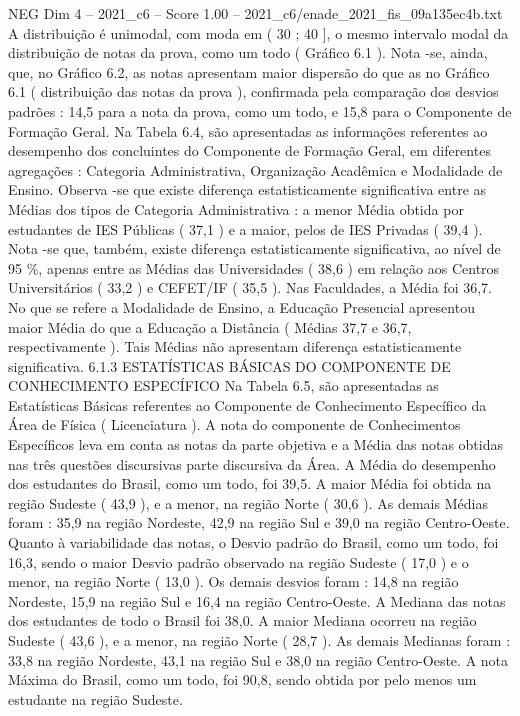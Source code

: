 \begin{textsample}{NEG Dim 4 – 2021\_c6 – Score 1.00 – 2021\_c6/enade\_2021\_fis\_09a135ec4b.txt}
A distribuição é unimodal, com moda em ( 30 ; 40 ], o mesmo intervalo modal da distribuição de notas da prova, como um todo ( Gráfico 6.1 ).
Nota -se, ainda, que, no Gráfico 6.2, as notas apresentam maior dispersão do que as no Gráfico 6.1 ( distribuição das notas da prova ), confirmada pela comparação dos desvios padrões : 14,5 para a nota da prova, como um todo, e 15,8 para o Componente de Formação Geral.
Na Tabela 6.4, são apresentadas as informações referentes ao desempenho dos concluintes do Componente de Formação Geral, em diferentes agregações : Categoria Administrativa, Organização Acadêmica e Modalidade de Ensino.
Observa -se que existe diferença estatisticamente significativa entre as Médias dos tipos de Categoria Administrativa : a menor Média obtida por estudantes de IES Públicas ( 37,1 ) e a maior, pelos de IES Privadas ( 39,4 ).
Nota -se que, também, existe diferença estatisticamente significativa, ao nível de 95 \%, apenas entre as Médias das Universidades ( 38,6 ) em relação aos Centros Universitários ( 33,2 ) e CEFET/IF ( 35,5 ).
Nas Faculdades, a Média foi 36,7.
No que se refere a Modalidade de Ensino, a Educação Presencial apresentou maior Média do que a Educação a Distância ( Médias 37,7 e 36,7, respectivamente ).
Tais Médias não apresentam diferença estatisticamente significativa. 6.1.3 ESTATÍSTICAS BÁSICAS DO COMPONENTE DE CONHECIMENTO ESPECÍFICO Na Tabela 6.5, são apresentadas as Estatísticas Básicas referentes ao Componente de Conhecimento Específico da Área de Física ( Licenciatura ).
A nota do componente de Conhecimentos Específicos leva em conta as notas da parte objetiva e a Média das notas obtidas nas três questões discursivas parte discursiva da Área.
A Média do desempenho dos estudantes do Brasil, como um todo, foi 39,5.
A maior Média foi obtida na região Sudeste ( 43,9 ), e a menor, na região Norte ( 30,6 ).
As demais Médias foram : 35,9 na região Nordeste, 42,9 na região Sul e 39,0 na região Centro-Oeste.
Quanto à variabilidade das notas, o Desvio padrão do Brasil, como um todo, foi 16,3, sendo o maior Desvio padrão observado na região Sudeste ( 17,0 ) e o menor, na região Norte ( 13,0 ).
Os demais desvios foram : 14,8 na região Nordeste, 15,9 na região Sul e 16,4 na região Centro-Oeste.
A Mediana das notas dos estudantes de todo o Brasil foi 38,0.
A maior Mediana ocorreu na região Sudeste ( 43,6 ), e a menor, na região Norte ( 28,7 ).
As demais Medianas foram : 33,8 na região Nordeste, 43,1 na região Sul e 38,0 na região Centro-Oeste.
A nota Máxima do Brasil, como um todo, foi 90,8, sendo obtida por pelo menos um estudante na região Sudeste.

\end{textsample}
